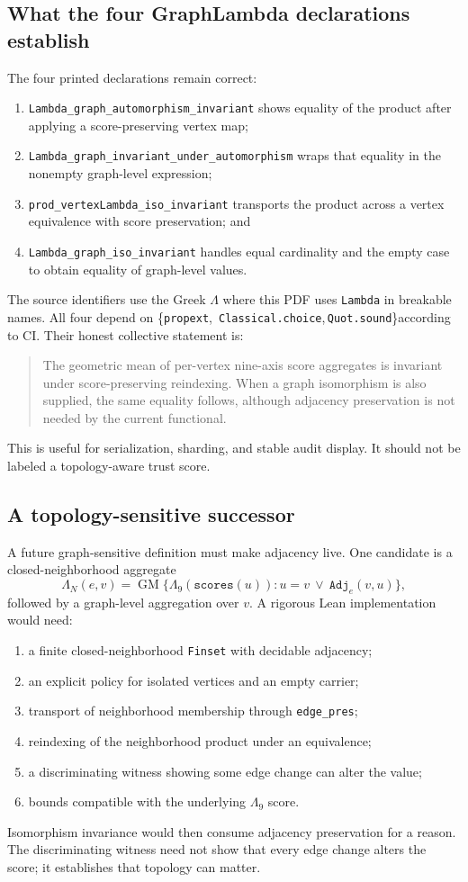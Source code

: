 \documentclass[10pt,letterpaper]{article}
\theoremstyle{definition}
\newcommand{\Lam}{\Lambda}
\newcommand{\coretrio}{\{\texttt{propext},\,\allowbreak
  \texttt{Classical.choice},\,\allowbreak\texttt{Quot.sound}\}}
\newcommand{\decl}[1]{\nolinkurl{#1}}
\begin{document}
\subsection{What the four GraphLambda declarations establish}
The four printed declarations remain correct:
\begin{enumerate}
\item \decl{Lambda_graph_automorphism_invariant} shows equality of the product
  after applying a score-preserving vertex map;
\item \decl{Lambda_graph_invariant_under_automorphism} wraps that equality in
  the nonempty graph-level expression;
\item \decl{prod_vertexLambda_iso_invariant} transports the product across a
  vertex equivalence with score preservation; and
\item \decl{Lambda_graph_iso_invariant} handles equal cardinality and the empty
  case to obtain equality of graph-level values.
\end{enumerate}
The source identifiers use the Greek \(\Lam\) where this PDF uses
\texttt{Lambda} in breakable names. All four depend on \coretrio according to
CI. Their honest collective statement is:
\begin{quote}
The geometric mean of per-vertex nine-axis score aggregates is invariant under
score-preserving reindexing. When a graph isomorphism is also supplied, the
same equality follows, although adjacency preservation is not needed by the
current functional.
\end{quote}
This is useful for serialization, sharding, and stable audit display. It should
not be labeled a topology-aware trust score.

\subsection{A topology-sensitive successor}
A future graph-sensitive definition must make adjacency live. One candidate is
a closed-neighborhood aggregate
\[
\Lam_N(e,v)=
\operatorname{GM}\{\Lam_9(\texttt{scores}(u)):
u=v\ \lor\ \texttt{Adj}_e(v,u)\},
\]
followed by a graph-level aggregation over \(v\). A rigorous Lean
implementation would need:
\begin{enumerate}
\item a finite closed-neighborhood \texttt{Finset} with decidable adjacency;
\item an explicit policy for isolated vertices and an empty carrier;
\item transport of neighborhood membership through \texttt{edge\_pres};
\item reindexing of the neighborhood product under an equivalence;
\item a discriminating witness showing some edge change can alter the value;
\item bounds compatible with the underlying \(\Lam_9\) score.
\end{enumerate}
Isomorphism invariance would then consume adjacency preservation for a reason.
The discriminating witness need not show that every edge change alters the
score; it establishes that topology can matter.
\end{document}
